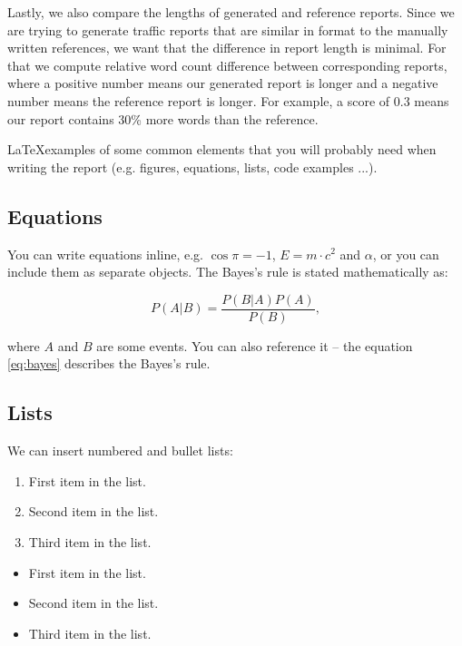 \documentclass[fleqn,moreauthors,10pt]{ds_report}
\begin{document}
Lastly, we also compare the lengths of generated and reference reports. Since we are trying to generate traffic reports that are similar in format to the manually written references, we want that the difference in report length is minimal. For that we compute relative word count difference between corresponding reports, where a positive number means our generated report is longer and a negative number means the reference report is longer. For example, a score of 0.3 means our report contains 30\% more words than the reference.

\iffalse
\LaTeX examples of some common elements that you will probably need when writing the report (e.g. figures, equations, lists, code examples ...).


\subsection*{Equations}

You can write equations inline, e.g. $\cos\pi=-1$, $E = m \cdot c^2$ and $\alpha$, or you can include them as separate objects. The Bayes’s rule is stated mathematically as:

\begin{equation}
	P(A|B) = \frac{P(B|A)P(A)}{P(B)},
	\label{eq:bayes}
\end{equation}

where $A$ and $B$ are some events. You can also reference it -- the equation \ref{eq:bayes} describes the Bayes's rule.

\subsection*{Lists}

We can insert numbered and bullet lists:

\begin{enumerate}[noitemsep] 
	\item First item in the list.
	\item Second item in the list.
	\item Third item in the list.
\end{enumerate}

\begin{itemize}[noitemsep] 
	\item First item in the list.
	\item Second item in the list.
	\item Third item in the list.
\end{itemize}
\end{document}
